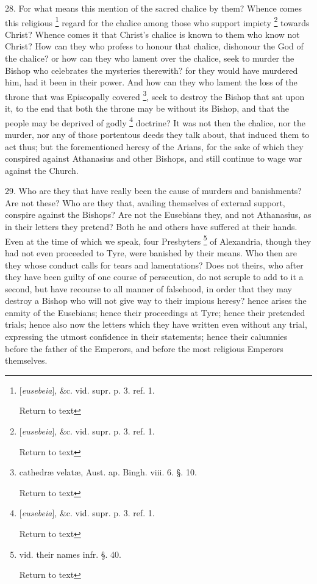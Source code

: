 28. For what means this mention of the sacred
chalice by them? Whence comes this religious \footnote{[\emph{eusebeia}], \&c. vid. supr. p. 3. ref. 1.

Return to text} regard for the chalice among those who support impiety \footnote{[\emph{eusebeia}], \&c. vid. supr. p. 3. ref. 1.

Return to text} towards Christ? Whence comes it that Christ's chalice is known
to them who know not Christ? How can they who profess to honour that
chalice, dishonour the God of the chalice? or how can they who lament
over the chalice, seek to murder the Bishop who celebrates the
mysteries therewith? for they would have murdered him, had it been in
their power. And how can they who lament the loss of the throne that
was Episcopally covered \footnote{cathedræ velatæ, Aust. ap. Bingh. viii. 6. §. 10.

Return to text},
seek to destroy the Bishop that sat upon it, to the end that both the
throne may be without its Bishop, and that the people may be deprived
of godly \footnote{[\emph{eusebeia}], \&c. vid. supr. p. 3. ref. 1.

Return to text} doctrine? It was not then
the chalice, nor the murder, nor any of those portentous deeds they
talk about, that induced them to act thus; but the forementioned
heresy of the Arians, for the sake of which they conspired against
Athanasius and other Bishops, and still continue to wage war against
the Church.

29. Who are they that have really been the cause
of murders and banishments? Are not these? Who are they that, availing
themselves of external support, conspire against the Bishops? Are not
the Eusebians they, and not Athanasius, as in their letters they
pretend? Both he and others have suffered at their hands. Even at the
time of which we speak, four Presbyters \footnote{vid. their names infr. §. 40.

Return to text} of Alexandria, though they had not even proceeded to Tyre,
were banished by their means. Who then are they whose conduct calls
for tears and lamentations? Does not theirs, who after they have
been guilty of one course of persecution, do not scruple to add to it
a second, but have recourse to all manner of falsehood, in order that
they may destroy a Bishop who will not give way to their impious
heresy? hence arises the enmity of the Eusebians; hence their
proceedings at Tyre; hence their pretended trials; hence also now the
letters which they have written even without any trial, expressing the
utmost confidence in their statements; hence their calumnies before
the father of the Emperors, and before the most religious Emperors
themselves.

